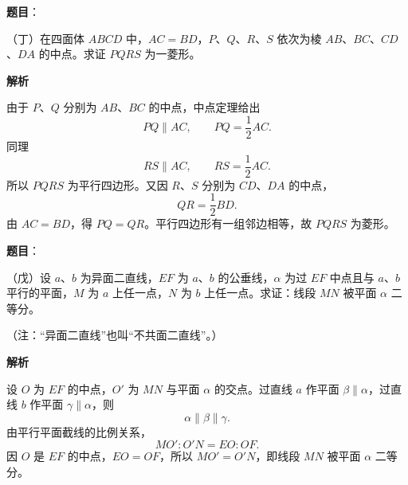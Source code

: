 \begin{answer}

\textbf{题目}：

（丁）在四面体 $ABCD$ 中，$AC=BD$，$P$、$Q$、$R$、$S$ 依次为棱 $AB$、$BC$、$CD$、$DA$ 的中点。求证 $PQRS$ 为一菱形。

\textbf{解析}
\nopagebreak[4]
\begin{center}\end{center}
\nopagebreak[4]
由于 $P$、$Q$ 分别为 $AB$、$BC$ 的中点，中点定理给出
\[
PQ\parallel AC,\qquad PQ=\frac12AC.
\]
同理
\[
RS\parallel AC,\qquad RS=\frac12AC.
\]
所以 $PQRS$ 为平行四边形。又因 $R$、$S$ 分别为 $CD$、$DA$ 的中点，
\[
QR=\frac12BD.
\]
由 $AC=BD$，得 $PQ=QR$。平行四边形有一组邻边相等，故 $PQRS$ 为菱形。


\end{answer}
\begin{answer}

\textbf{题目}：

（戊）设 $a$、$b$ 为异面二直线，$EF$ 为 $a$、$b$ 的公垂线，$\alpha$ 为过 $EF$ 中点且与 $a$、$b$ 平行的平面，$M$ 为 $a$ 上任一点，$N$ 为 $b$ 上任一点。求证：线段 $MN$ 被平面 $\alpha$ 二等分。

（注：“异面二直线”也叫“不共面二直线”。）

\textbf{解析}
\nopagebreak[4]
\begin{center}\end{center}
\nopagebreak[4]
设 $O$ 为 $EF$ 的中点，$O'$ 为 $MN$ 与平面 $\alpha$ 的交点。过直线 $a$ 作平面 $\beta\parallel\alpha$，过直线 $b$ 作平面 $\gamma\parallel\alpha$，则
\[
\alpha\parallel\beta\parallel\gamma.
\]
由平行平面截线的比例关系，
\[
MO':O'N=EO:OF.
\]
因 $O$ 是 $EF$ 的中点，$EO=OF$，所以 $MO'=O'N$，即线段 $MN$ 被平面 $\alpha$ 二等分。


\end{answer}

